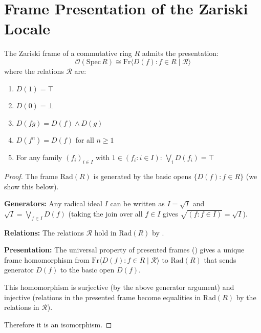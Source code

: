 \section{Frame Presentation of the Zariski Locale}

\begin{theorem}
  \label{thm:zariski-frame-presentation}
  \leanok
  The Zariski frame of a commutative ring $R$ admits the presentation:
  $$\mathcal{O}(\mathrm{Spec}\, R) \cong \mathrm{Fr}\langle D(f) : f \in R \mid \mathcal{R} \rangle$$
  where the relations $\mathcal{R}$ are:
  \begin{enumerate}
    \item $D(1) = \top$
    \item $D(0) = \bot$
    \item $D(fg) = D(f) \land D(g)$
    \item $D(f^n) = D(f)$ for all $n \geq 1$
    \item For any family $(f_i)_{i \in I}$ with $1 \in (f_i : i \in I)$: $\bigvee_i D(f_i) = \top$
  \end{enumerate}
\end{theorem}

\begin{proof}
  \leanok
  The frame $\mathrm{Rad}(R)$ is generated by the basic opens $\{D(f) : f \in R\}$ (we show this below).

  \textbf{Generators:} Any radical ideal $I$ can be written as $I = \sqrt{I}$ and $\sqrt{I} = \bigvee_{f \in I} D(f)$
  (taking the join over all $f \in I$ gives $\sqrt{(f : f \in I)} = \sqrt{I}$).

  \textbf{Relations:} The relations $\mathcal{R}$ hold in $\mathrm{Rad}(R)$ by .

  \textbf{Presentation:} The universal property of presented frames ()
  gives a unique frame homomorphism from $\mathrm{Fr}\langle D(f) : f \in R \mid \mathcal{R} \rangle$ to $\mathrm{Rad}(R)$
  that sends generator $D(f)$ to the basic open $D(f)$.

  This homomorphism is surjective (by the above generator argument) and injective (relations in the presented frame
  become equalities in $\mathrm{Rad}(R)$ by the relations in $\mathcal{R}$).

  Therefore it is an isomorphism.
\end{proof}


